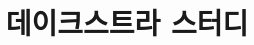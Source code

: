 \documentclass{beamer}
\title{데이크스트라 스터디}
\author{}
\date{\number\year년 \number\month월 \number\day일}
\begin{document}
\frame{\titlepage}





\end{document}
